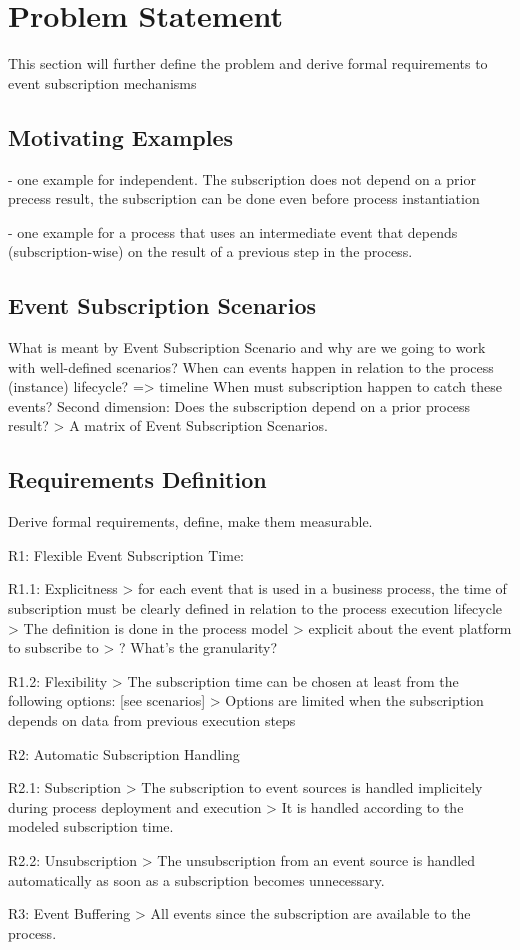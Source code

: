 \chapter{Problem Statement}\label{ch:problemstatement}

This section will further define the problem and derive formal requirements to event subscription mechanisms

\section{Motivating Examples}
- one example for independent. The subscription does not depend on a prior precess result, the subscription can be done even before process instantiation

- one example for a process that uses an intermediate event that depends (subscription-wise) on the result of a previous step in the process.

\section{Event Subscription Scenarios}
What is meant by Event Subscription Scenario and why are we going to work with well-defined scenarios?
When can events happen in relation to the process (instance) lifecycle? => timeline
When must subscription happen to catch these events?
Second dimension: Does the subscription depend on a prior process result?
> A matrix of Event Subscription Scenarios.

\section{Requirements Definition}
Derive formal requirements, define, make them measurable.

R1: Flexible Event Subscription Time:

R1.1: Explicitness
> for each event that is used in a business process, the time of subscription must be clearly defined in relation to the process execution lifecycle
> The definition is done in the process model
> explicit about the event platform to subscribe to
> ? What's the granularity?

R1.2: Flexibility
> The subscription time can be chosen at least from the following options: [see scenarios]
> Options are limited when the subscription depends on data from previous execution steps

R2: Automatic Subscription Handling

R2.1: Subscription
> The subscription to event sources is handled implicitely during process deployment and execution
> It is handled according to the modeled subscription time.

R2.2: Unsubscription
> The unsubscription from an event source is handled automatically as soon as a subscription becomes unnecessary.

R3: Event Buffering
> All events since the subscription are available to the process.